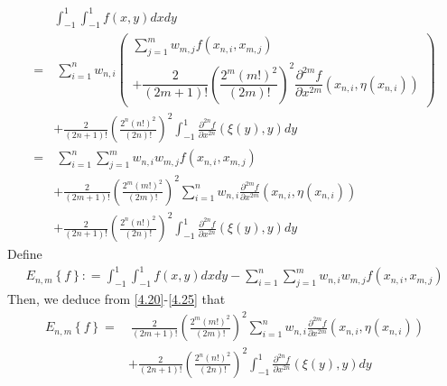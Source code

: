 \documentclass[a4paper]{article}
\numberwithin{equation}{section}
\begin{document}
\begin{align}
\label{4.20}
&\int_{ - 1}^1 {\int_{ - 1}^1 {f\left( {x,y} \right)dx} dy} \\
=&\ \sum\limits_{i = 1}^n {{w_{n,i}}\left( {\begin{array}{*{20}{l}}
{\sum\limits_{j = 1}^m {{w_{m,j}}f\left( {{x_{n,i}},{x_{m,j}}} \right)} }\\
{ + \dfrac{2}{{\left( {2m + 1} \right)!}}{{\left( {\dfrac{{{2^m}{{\left( {m!} \right)}^2}}}{{\left( {2m} \right)!}}} \right)}^2}\dfrac{{{\partial ^{2m}}f}}{{\partial {x^{2m}}}}\left( {{x_{n,i}},\eta \left( {{x_{n,i}}} \right)} \right)}
\end{array}} \right)} \\
& + \frac{2}{{\left( {2n + 1} \right)!}}{\left( {\frac{{{2^n}{{\left( {n!} \right)}^2}}}{{\left( {2n} \right)!}}} \right)^2}\int_{ - 1}^1 {\frac{{{\partial ^{2n}}f}}{{\partial {x^{2n}}}}\left( {\xi \left( y \right),y} \right)dy} \\
=&\ \sum\limits_{i = 1}^n {\sum\limits_{j = 1}^m {{w_{n,i}}{w_{m,j}}f\left( {{x_{n,i}},{x_{m,j}}} \right)} } \\
& + \frac{2}{{\left( {2m + 1} \right)!}}{\left( {\frac{{{2^m}{{\left( {m!} \right)}^2}}}{{\left( {2m} \right)!}}} \right)^2}\sum\limits_{i = 1}^n {{w_{n,i}}\frac{{{\partial ^{2m}}f}}{{\partial {x^{2m}}}}\left( {{x_{n,i}},\eta \left( {{x_{n,i}}} \right)} \right)} \\
& + \frac{2}{{\left( {2n + 1} \right)!}}{\left( {\frac{{{2^n}{{\left( {n!} \right)}^2}}}{{\left( {2n} \right)!}}} \right)^2}\int_{ - 1}^1 {\frac{{{\partial ^{2n}}f}}{{\partial {x^{2n}}}}\left( {\xi \left( y \right),y} \right)dy}   \label{4.25}
\end{align}
Define
\begin{align}
{E_{n,m}}\left\{ f \right\}: = \int_{ - 1}^1 {\int_{ - 1}^1 {f\left( {x,y} \right)dx} dy}  - \sum\limits_{i = 1}^n {\sum\limits_{j = 1}^m {{w_{n,i}}{w_{m,j}}f\left( {{x_{n,i}},{x_{m,j}}} \right)} } 
\end{align}
Then, we deduce from \eqref{4.20}-\eqref{4.25} that
\begin{align}
{E_{n,m}}\left\{ f \right\} =&\ \frac{2}{{\left( {2m + 1} \right)!}}{\left( {\frac{{{2^m}{{\left( {m!} \right)}^2}}}{{\left( {2m} \right)!}}} \right)^2}\sum\limits_{i = 1}^n {{w_{n,i}}\frac{{{\partial ^{2m}}f}}{{\partial {x^{2m}}}}\left( {{x_{n,i}},\eta \left( {{x_{n,i}}} \right)} \right)} \\
& + \frac{2}{{\left( {2n + 1} \right)!}}{\left( {\frac{{{2^n}{{\left( {n!} \right)}^2}}}{{\left( {2n} \right)!}}} \right)^2}\int_{ - 1}^1 {\frac{{{\partial ^{2n}}f}}{{\partial {x^{2n}}}}\left( {\xi \left( y \right),y} \right)dy} 
\end{align}
\end{document}
